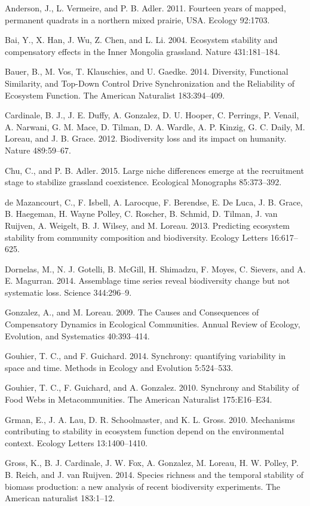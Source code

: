 \documentclass[11pt,]{article}
\begin{document}
Anderson, J., L. Vermeire, and P. B. Adler. 2011. Fourteen years of
mapped, permanent quadrats in a northern mixed prairie, USA. Ecology
92:1703.

Bai, Y., X. Han, J. Wu, Z. Chen, and L. Li. 2004. Ecosystem stability
and compensatory effects in the Inner Mongolia grassland. Nature
431:181--184.

Bauer, B., M. Vos, T. Klauschies, and U. Gaedke. 2014. Diversity,
Functional Similarity, and Top-Down Control Drive Synchronization and
the Reliability of Ecosystem Function. The American Naturalist
183:394--409.

Cardinale, B. J., J. E. Duffy, A. Gonzalez, D. U. Hooper, C. Perrings,
P. Venail, A. Narwani, G. M. Mace, D. Tilman, D. A. Wardle, A. P.
Kinzig, G. C. Daily, M. Loreau, and J. B. Grace. 2012. Biodiversity loss
and its impact on humanity. Nature 489:59--67.

Chu, C., and P. B. Adler. 2015. Large niche differences emerge at the
recruitment stage to stabilize grassland coexistence. Ecological
Monographs 85:373--392.

{{de Mazancourt}}, C., F. Isbell, A. Larocque, F. Berendse, E. {De
Luca}, J. B. Grace, B. Haegeman, H. {Wayne Polley}, C. Roscher, B.
Schmid, D. Tilman, J. van Ruijven, A. Weigelt, B. J. Wilsey, and M.
Loreau. 2013. Predicting ecosystem stability from community composition
and biodiversity. Ecology Letters 16:617--625.

Dornelas, M., N. J. Gotelli, B. McGill, H. Shimadzu, F. Moyes, C.
Sievers, and A. E. Magurran. 2014. Assemblage time series reveal
biodiversity change but not systematic loss. Science 344:296--9.

Gonzalez, A., and M. Loreau. 2009. The Causes and Consequences of
Compensatory Dynamics in Ecological Communities. Annual Review of
Ecology, Evolution, and Systematics 40:393--414.

Gouhier, T. C., and F. Guichard. 2014. Synchrony: quantifying
variability in space and time. Methods in Ecology and Evolution
5:524--533.

Gouhier, T. C., F. Guichard, and A. Gonzalez. 2010. Synchrony and
Stability of Food Webs in Metacommunities. The American Naturalist
175:E16--E34.

Grman, E., J. A. Lau, D. R. Schoolmaster, and K. L. Gross. 2010.
Mechanisms contributing to stability in ecosystem function depend on the
environmental context. Ecology Letters 13:1400--1410.

Gross, K., B. J. Cardinale, J. W. Fox, A. Gonzalez, M. Loreau, H. W.
Polley, P. B. Reich, and J. van Ruijven. 2014. Species richness and the
temporal stability of biomass production: a new analysis of recent
biodiversity experiments. The American naturalist 183:1--12.
\end{document}
